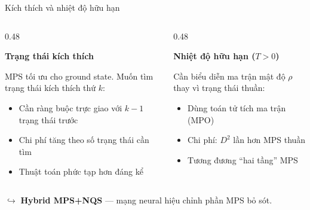 \documentclass[aspectratio=169, 11pt]{beamer}
\newcommand{\highlight}[1]{\textcolor{qcyan}{\textbf{#1}}}
\begin{document}
\begin{frame}{Kích thích và nhiệt độ hữu hạn}

\begin{columns}[T]
\begin{column}{0.48\textwidth}

\textcolor{qpink}{\textbf{Trạng thái kích thích}}\\[4pt]
{\small MPS tối ưu cho ground state. Muốn tìm trạng thái kích thích thứ $k$:
\begin{itemize}
  \item Cần ràng buộc trực giao với $k{-}1$ trạng thái trước
  \item Chi phí tăng theo số trạng thái cần tìm
  \item Thuật toán phức tạp hơn đáng kể
\end{itemize}}

\end{column}
\begin{column}{0.48\textwidth}

\textcolor{qpink}{\textbf{Nhiệt độ hữu hạn ($T>0$)}}\\[4pt]
{\small Cần biểu diễn ma trận mật độ $\rho$ thay vì trạng thái thuần:
\begin{itemize}
  \item Dùng toán tử tích ma trận (MPO)
  \item Chi phí: $D^2$ lần hơn MPS thuần
  \item Tương đương ``hai tầng'' MPS
\end{itemize}}

\end{column}
\end{columns}

\vspace{12pt}
{\small\textcolor{dimtext}{$\hookrightarrow$ \highlight{Hybrid MPS+NQS} — mạng neural hiệu chỉnh phần MPS bỏ sót.}}

\end{frame}
\end{document}
